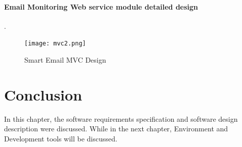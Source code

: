 \paragraph{Email Monitoring Web service module detailed design}
.\\
\begin{figure}[H]
  \centering
  \texttt{[image: mvc2.png]}
  \caption[Smart Email MVC Design]{Smart Email MVC Design}
\end{figure}


\section{Conclusion}
In this chapter, the software requirements specification and software design
description were discussed. While in the next chapter, Environment and 
Development tools will be discussed.
